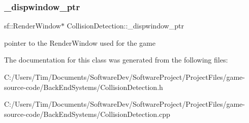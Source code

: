 \subsubsection{\texorpdfstring{\+\_\+dispwindow\+\_\+ptr}{\_dispwindow\_ptr}}
{\footnotesize\ttfamily sf\+::\+Render\+Window$\ast$ Collision\+Detection\+::\+\_\+dispwindow\+\_\+ptr\hspace{0.3cm}{\ttfamily [private]}}

pointer to the Render\+Window used for the game 

The documentation for this class was generated from the following files\+:\begin{DoxyCompactItemize}
\item 
C\+:/\+Users/\+Tim/\+Documents/\+Software\+Dev/\+Software\+Project/\+Project\+Files/game-\/source-\/code/\+Back\+End\+Systems/Collision\+Detection.\+h\item 
C\+:/\+Users/\+Tim/\+Documents/\+Software\+Dev/\+Software\+Project/\+Project\+Files/game-\/source-\/code/\+Back\+End\+Systems/Collision\+Detection.\+cpp\end{DoxyCompactItemize}
